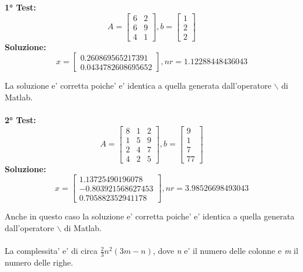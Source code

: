 \documentclass[10pt,a4paper]{article}
\begin{document}
\textbf{1° Test:}
\[
  A =
  \begin{bmatrix}
    6 & 2 \\
    6 & 9 \\
    4 & 1
  \end{bmatrix},
  b =
  \begin{bmatrix}
    1 \\ 2 \\ 2
  \end{bmatrix}
\]
\textbf{Soluzione:}
\[
  x =
  \begin{bmatrix}
    0.260869565217391 \\
    0.0434782608695652
  \end{bmatrix},
  \textit{nr} = 1.12288448436043
\]

La soluzione e' corretta poiche' e' identica a quella generata dall'operatore
$ \backslash $ di Matlab.
\\ \\
\textbf{2° Test:}
\[
  A =
  \begin{bmatrix}
    8 & 1 & 2 \\
    1 & 5 & 9 \\
    2 & 4 & 7 \\
    4 & 2 & 5
  \end{bmatrix},
  b =
  \begin{bmatrix}
    9 \\ 1 \\ 7 \\ 77
  \end{bmatrix}
\]
\textbf{Soluzione:}
\[
  x =
  \begin{bmatrix}
    1.13725490196078   \\
    -0.803921568627453 \\
    0.705882352941178
  \end{bmatrix},
  \textit{nr} = 3.98526698493043
\]

Anche in questo caso la soluzione e' corretta poiche' e' identica a quella
generata dall'operatore $ \backslash $ di Matlab.
\\
\\
La complessita' e' di circa $ \frac{2}{ 3}n^2(3m-n) $, dove \textit{n} e'
il numero delle colonne e \textit{m} il numero delle righe.
\end{document}
